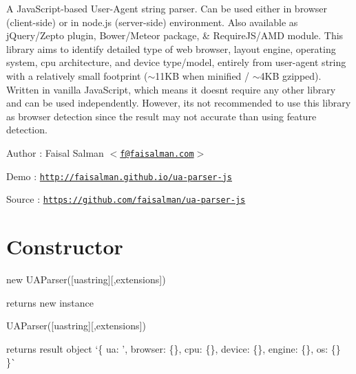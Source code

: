  A Java\+Script-\/based User-\/\+Agent string parser. Can be used either in browser (client-\/side) or in node.\+js (server-\/side) environment. Also available as j\+Query/\+Zepto plugin, Bower/\+Meteor package, \& Require\+J\+S/\+A\+MD module. This library aims to identify detailed type of web browser, layout engine, operating system, cpu architecture, and device type/model, entirely from user-\/agent string with a relatively small footprint ($\sim$11\+KB when minified / $\sim$4\+KB gzipped). Written in vanilla Java\+Script, which means it doesn\textquotesingle{}t require any other library and can be used independently. However, it\textquotesingle{}s not recommended to use this library as browser detection since the result may not accurate than using feature detection.

\href{https://travis-ci.org/faisalman/ua-parser-js}{\tt } \href{https://www.npmjs.com/package/ua-parser-js}{\tt } \href{https://www.npmjs.com/package/ua-parser-js}{\tt } \href{https://bower.io/}{\tt } \href{https://cdnjs.com/libraries/UAParser.js}{\tt } \href{https://gratipay.com/UAParser.js}{\tt } \href{http://flattr.com/thing/3867907/faisalmanua-parser-js-on-GitHub}{\tt }


\begin{DoxyItemize}
\item Author \+: Faisal Salman $<$\href{mailto:f@faisalman.com}{\tt f@faisalman.\+com}$>$
\item Demo \+: \href{http://faisalman.github.io/ua-parser-js}{\tt http\+://faisalman.\+github.\+io/ua-\/parser-\/js}
\item Source \+: \href{https://github.com/faisalman/ua-parser-js}{\tt https\+://github.\+com/faisalman/ua-\/parser-\/js}
\end{DoxyItemize}

\section*{Constructor}


\begin{DoxyItemize}
\item {\ttfamily new U\+A\+Parser(\mbox{[}uastring\mbox{]}\mbox{[},extensions\mbox{]})}
\begin{DoxyItemize}
\item returns new instance
\end{DoxyItemize}
\item {\ttfamily U\+A\+Parser(\mbox{[}uastring\mbox{]}\mbox{[},extensions\mbox{]})}
\begin{DoxyItemize}
\item returns result object `\{ ua\+: '\textquotesingle{}, browser\+: \{\}, cpu\+: \{\}, device\+: \{\}, engine\+: \{\}, os\+: \{\} \}\`{}
\end{DoxyItemize}
\end{DoxyItemize}

